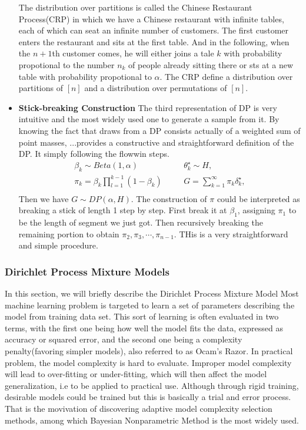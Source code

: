 \begin{itemize}
	The distribution over partitions is called the Chinese Restaurant Process(CRP) in which we have a Chinese restaurant with infinite tables, each of which can seat an infinite number of customers. The first customer enters the restaurant and sits at the first table. And in the following, when the $n+1$th customer comes, he will either joins a tale $k$ with probability propotional to the number $n_k$ of people already sitting there or sts at a new table with probability propotional to $\alpha$. The CRP define a distribution over partitions of $[n]$ and a distribution over permutations of $[n]$. 
	\item \textbf{Stick-breaking Construction} 
	The  third representation of DP is very intuitive and the most widely used one to generate a sample from it. By knowing the fact that draws from a DP consists actually of a weighted sum of point masses, ...provides a constructive and straightforward definition of the DP. It simply following the flowwin steps.
\begin{eqnarray}
	\beta_k\sim Beta(1,\alpha)&\quad&\theta_k^\star\sim H,\\
	\pi_k=\beta_k\prod_{l=1}^{k-1}(1-\beta_k)&\quad&G=\sum_{k=1}^{\infty}\pi_k\delta_k^\star,\\
\end{eqnarray}
Then we have $G\sim DP(\alpha,H)$. The construction of $\pi$ could be interpreted as breaking a stick of length 1 step by step. First break it at $\beta_1$, assigning $\pi_1$ to be the length of segment we just got. Then recursively breaking the remaining portion to obtain $\pi_2,\pi_3,\cdots,\pi_{n-1}$. THis is a very straightforward and simple procedure.
\end{itemize}   

\subsubsection{ Dirichlet Process Mixture Models}\label{bnp}
In this section, we will briefly describe the Dirichlet Process Mixture Model
Most machine learning problem is targeted to learn a set of parameters describing the model from training data set. This sort of learning is often evaluated in two terms, with the first one being how well the model fits the data, expressed as accuracy or squared error, and the second one being a complexity penalty(favoring simpler models)\cite{gershman2012tutorial,escobar1995bayesian}, also referred to as Ocam's Razor. In practical problem, the model complexity is hard to evaluate. Improper model complexity will lead to over-fitting or under-fitting\cite{gershman2012tutorial,muller2004nonparametric}, which will then affect the model generalization, i.e to be applied to practical use. Although through rigid training, desirable models could be trained but this is basically a trial and error process\cite{hjort2010bayesian}. That is the movivation of discovering adaptive model complexity selection methods, among which Bayesian Nonparametric Method is the most widely used.

